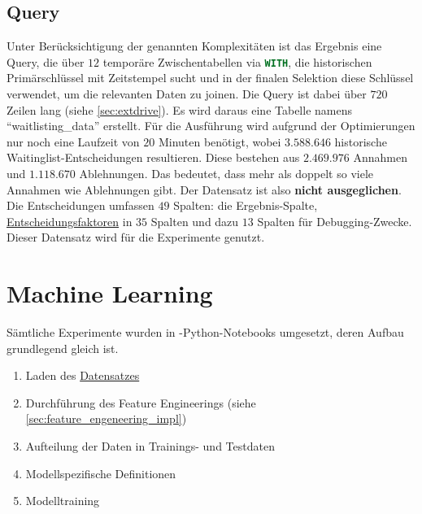 \subsection{Query}
Unter Berücksichtigung der genannten Komplexitäten ist das Ergebnis eine Query, die über $12$ temporäre Zwischentabellen via \lstinline[language=SQL]|WITH|, die historischen Primärschlüssel mit Zeitstempel sucht und in der finalen Selektion diese Schlüssel verwendet, um die relevanten Daten zu joinen. 
Die Query ist dabei über $720$ Zeilen lang (siehe \ref{sec:extdrive}).
Es wird daraus eine Tabelle namens \enquote{waitlisting\_data} erstellt.
Für die Ausführung wird aufgrund der Optimierungen nur noch eine Laufzeit von $20$ Minuten benötigt, wobei $3.588.646$\label{ref:dataset} historische Waitinglist-Entscheidungen resultieren. 
Diese bestehen aus $2.469.976$ Annahmen und $1.118.670$ Ablehnungen. 
Das bedeutet, dass mehr als doppelt so viele Annahmen wie Ablehnungen gibt.
Der Datensatz ist also \textbf{nicht ausgeglichen}.
Die Entscheidungen umfassen $49$ Spalten: die Ergebnis-Spalte, \hyperref[tab:waitinglistattr]{Entscheidungsfaktoren} in $35$ Spalten und dazu $13$ Spalten für Debugging-Zwecke. 
Dieser Datensatz wird für die Experimente genutzt.

\section{Machine Learning}

Sämtliche Experimente wurden in -Python-Notebooks umgesetzt, deren Aufbau grundlegend gleich ist. 

\begin{enumerate}[noitemsep]
    \item Laden des \hyperref[ref:dataset]{Datensatzes}
    \item Durchführung des Feature Engineerings (siehe \ref{sec:feature_engeneering_impl})
    \item Aufteilung der Daten in Trainings- und Testdaten
    \item Modellspezifische Definitionen
    \item Modelltraining
\end{enumerate}

